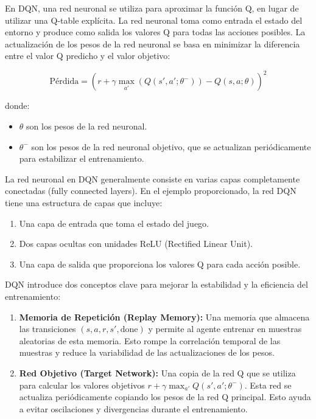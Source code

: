 \documentclass[10pt]{article}
\begin{document}
En DQN, una red neuronal se utiliza para aproximar la función Q, en lugar de utilizar una Q-table explícita. La red neuronal toma como entrada el estado del entorno y produce como salida los valores Q para todas las acciones posibles. La actualización de los pesos de la red neuronal se basa en minimizar la diferencia entre el valor Q predicho y el valor objetivo:

\[ \text{Pérdida} = \left( r + \gamma \max_{a'}(Q(s', a'; \theta^-)) - Q(s, a; \theta) \right)^2 \]

donde:

\begin{itemize}
	\item \( \theta \) son los pesos de la red neuronal.
	\item \( \theta^- \) son los pesos de la red neuronal objetivo, que se actualizan periódicamente para estabilizar el entrenamiento.
\end{itemize}

La red neuronal en DQN generalmente consiste en varias capas completamente conectadas (fully connected layers). En el ejemplo proporcionado, la red DQN tiene una estructura de capas que incluye:
\begin{enumerate}
	\item Una capa de entrada que toma el estado del juego.
	\item Dos capas ocultas con unidades ReLU (Rectified Linear Unit).
	\item Una capa de salida que proporciona los valores Q para cada acción posible.
\end{enumerate}

DQN introduce dos conceptos clave para mejorar la estabilidad y la eficiencia del entrenamiento:
\begin{enumerate}
	\item \textbf{Memoria de Repetición (Replay Memory):} Una memoria que almacena las transiciones \((s, a, r, s', \text{done})\) y permite al agente entrenar en muestras aleatorias de esta memoria. Esto rompe la correlación temporal de las muestras y reduce la variabilidad de las actualizaciones de los pesos.
	\item \textbf{Red Objetivo (Target Network):} Una copia de la red Q que se utiliza para calcular los valores objetivos \( r + \gamma \max_{a'} Q(s', a'; \theta^-) \). Esta red se actualiza periódicamente copiando los pesos de la red Q principal. Esto ayuda a evitar oscilaciones y divergencias durante el entrenamiento.
\end{enumerate}
\end{document}

